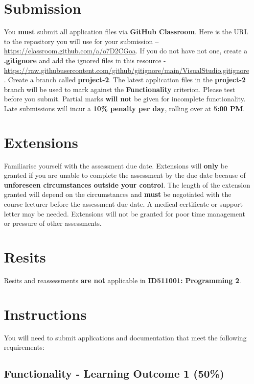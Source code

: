 \documentclass{article}
\begin{document}
\section*{Submission}
You \textbf{must} submit all application files via \textbf{GitHub Classroom}. Here is the URL to the repository you will use for your submission – \href{https://classroom.github.com/a/o7D2CGoa}{https://classroom.github.com/a/o7D2CGoa}. If you do not have not one, create a \textbf{.gitignore} and add the ignored files in this resource - \href{https://raw.githubusercontent.com/github/gitignore/main/VisualStudio.gitignore}{https://raw.githubusercontent.com/github/gitignore/main/VisualStudio.gitignore}. Create a branch called \textbf{project-2}. The latest application files in the \textbf{project-2} branch will be used to mark against the \textbf{Functionality} criterion. Please test before you submit. Partial marks \textbf{will not} be given for incomplete functionality. Late submissions will incur a \textbf{10\% penalty per day}, rolling over at \textbf{5:00 PM}.

\section*{Extensions}
Familiarise yourself with the assessment due date. Extensions will \textbf{only} be granted if you are unable to complete the assessment by the due date because of \textbf{unforeseen circumstances outside your control}. The length of the extension granted will depend on the circumstances and \textbf{must} be negotiated with the course lecturer before the assessment due date. A medical certificate or support letter may be needed. Extensions will not be granted for poor time management or pressure of other assessments.

\section*{Resits}
Resits and reassessments \textbf{are not} applicable in \textbf{ID511001: Programming 2}.

\section*{Instructions}
You will need to submit applications and documentation that meet the following requirements:\\

\subsection*{Functionality - Learning Outcome 1 (50\%)}
\end{document}
